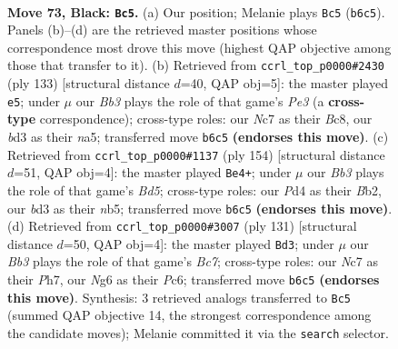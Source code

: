\documentclass[11pt]{article}
\begin{document}
\clearpage

\begin{figure}[p]\centering
\begin{subfigure}{0.46\textwidth}\centering
\resizebox{\linewidth}{!}{%
\newchessgame
\chessboard[
  setfen={8/2n5/1b1N2nk/p7/P2pP3/1P1B3p/1K2P3/8 b - - 13 73},
  showmover=false,
  pgfstyle=straightmove, color=movearrow, markmove={b6-c5}
]}
\caption{}
\end{subfigure}\hfill
\begin{subfigure}{0.46\textwidth}\centering
\resizebox{\linewidth}{!}{%
\newchessgame
\chessboard[
  setfen={2b5/3n4/3kp3/NPp3p1/2P3P1/4K3/4B3/8 b - - 5 67},
  showmover=false,
  pgfstyle=straightmove, color=movearrow, markmove={e6-e5}
]}
\caption{}
\end{subfigure}
\\[4pt]
\begin{subfigure}{0.46\textwidth}\centering
\resizebox{\linewidth}{!}{%
\newchessgame
\chessboard[
  setfen={5b2/1r5k/1pNp4/1n1B3p/7P/6P1/1B4K1/8 w - - 3 78},
  showmover=false,
  pgfstyle=straightmove, color=movearrow, markmove={d5-e4}
]}
\caption{}
\end{subfigure}\hfill
\begin{subfigure}{0.46\textwidth}\centering
\resizebox{\linewidth}{!}{%
\newchessgame
\chessboard[
  setfen={8/7p/2p5/5p1k/p4P2/P1B4K/1Pb4P/8 b - - 16 66},
  showmover=false,
  pgfstyle=straightmove, color=movearrow, markmove={c2-d3}
]}
\caption{}
\end{subfigure}
\caption{\textbf{Move 73, Black: \texttt{Bc5}.} (a) Our position; Melanie plays \texttt{Bc5} (\texttt{b6c5}). Panels (b)--(d) are the retrieved master positions whose correspondence most drove this move (highest QAP objective among those that transfer to it). (b) Retrieved from \texttt{ccrl\_top\_p0000\#2430} (ply 133) [structural distance $d$=40, QAP obj=5]: the master played \texttt{e5}; under $\mu$ our \emph{Bb3} plays the role of that game's \emph{Pe3} (a \textbf{cross-type} correspondence); cross-type roles: our \emph{N}c7 as their \emph{B}c8, our \emph{b}d3 as their \emph{n}a5; transferred move \texttt{b6c5} \textbf{(endorses this move)}. (c) Retrieved from \texttt{ccrl\_top\_p0000\#1137} (ply 154) [structural distance $d$=51, QAP obj=4]: the master played \texttt{Be4+}; under $\mu$ our \emph{Bb3} plays the role of that game's \emph{Bd5}; cross-type roles: our \emph{P}d4 as their \emph{B}b2, our \emph{b}d3 as their \emph{n}b5; transferred move \texttt{b6c5} \textbf{(endorses this move)}. (d) Retrieved from \texttt{ccrl\_top\_p0000\#3007} (ply 131) [structural distance $d$=50, QAP obj=4]: the master played \texttt{Bd3}; under $\mu$ our \emph{Bb3} plays the role of that game's \emph{Bc7}; cross-type roles: our \emph{N}c7 as their \emph{P}h7, our \emph{N}g6 as their \emph{P}c6; transferred move \texttt{b6c5} \textbf{(endorses this move)}. Synthesis: 3 retrieved analogs transferred to \texttt{Bc5} (summed QAP objective 14, the strongest correspondence among the candidate moves); Melanie committed it via the \texttt{search} selector.}
\label{fig:thought-m145}
\end{figure}
\end{document}
